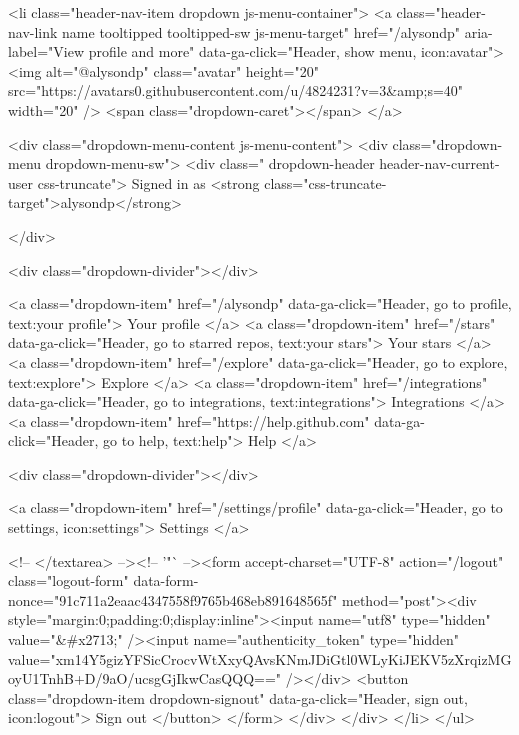   <li class="header-nav-item dropdown js-menu-container">
    <a class="header-nav-link name tooltipped tooltipped-sw js-menu-target" href="/alysondp"
       aria-label="View profile and more"
       data-ga-click="Header, show menu, icon:avatar">
      <img alt="@alysondp" class="avatar" height="20" src="https://avatars0.githubusercontent.com/u/4824231?v=3&amp;s=40" width="20" />
      <span class="dropdown-caret"></span>
    </a>

    <div class="dropdown-menu-content js-menu-content">
      <div class="dropdown-menu  dropdown-menu-sw">
        <div class=" dropdown-header header-nav-current-user css-truncate">
            Signed in as <strong class="css-truncate-target">alysondp</strong>

        </div>


        <div class="dropdown-divider"></div>

          <a class="dropdown-item" href="/alysondp" data-ga-click="Header, go to profile, text:your profile">
            Your profile
          </a>
        <a class="dropdown-item" href="/stars" data-ga-click="Header, go to starred repos, text:your stars">
          Your stars
        </a>
          <a class="dropdown-item" href="/explore" data-ga-click="Header, go to explore, text:explore">
            Explore
          </a>
          <a class="dropdown-item" href="/integrations" data-ga-click="Header, go to integrations, text:integrations">
            Integrations
          </a>
        <a class="dropdown-item" href="https://help.github.com" data-ga-click="Header, go to help, text:help">
          Help
        </a>


          <div class="dropdown-divider"></div>

          <a class="dropdown-item" href="/settings/profile" data-ga-click="Header, go to settings, icon:settings">
            Settings
          </a>

          <!-- </textarea> --><!-- '"` --><form accept-charset="UTF-8" action="/logout" class="logout-form" data-form-nonce="91c711a2eaac4347558f9765b468eb891648565f" method="post"><div style="margin:0;padding:0;display:inline"><input name="utf8" type="hidden" value="&#x2713;" /><input name="authenticity_token" type="hidden" value="xm14Y5gizYFSicCrocvWtXxyQAvsKNmJDiGtl0WLyKiJEKV5zXrqizMGoyU1TnhB+D/9aO/ucsgGjIkwCasQQQ==" /></div>
            <button class="dropdown-item dropdown-signout" data-ga-click="Header, sign out, icon:logout">
              Sign out
            </button>
</form>
      </div>
    </div>
  </li>
</ul>



